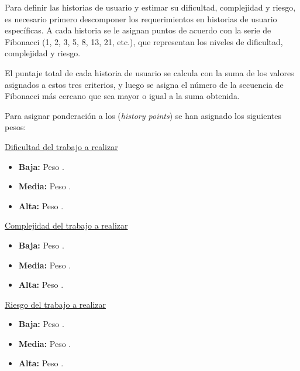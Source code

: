 Para definir las historias de usuario y estimar su dificultad, complejidad y
riesgo, es necesario primero descomponer los requerimientos en historias de
usuario específicas. A cada historia se le asignan puntos de acuerdo con la
serie de Fibonacci (1, 2, 3, 5, 8, 13, 21, etc.), que representan los niveles
de dificultad, complejidad y riesgo.

El puntaje total de cada historia de usuario se calcula con la suma de los
valores asignados a estos tres criterios, y luego se asigna el número de la
secuencia de Fibonacci más cercano que sea mayor o igual a la suma obtenida.

Para asignar ponderación a los (\textit{history points}) se han asignado los
siguientes pesos:

\pagebreak

\underline{Dificultad del trabajo a realizar}
\begin{itemize}
	\item \textbf{Baja:} Peso .
	\item \textbf{Media:} Peso .
	\item \textbf{Alta:} Peso .
\end{itemize}

\underline{Complejidad del trabajo a realizar}
\begin{itemize}
	\item \textbf{Baja:} Peso .
	\item \textbf{Media:} Peso .
	\item \textbf{Alta:} Peso .
\end{itemize}

\underline{Riesgo del trabajo a realizar}
\begin{itemize}
	\item \textbf{Baja:} Peso .
	\item \textbf{Media:} Peso .
	\item \textbf{Alta:} Peso .
\end{itemize}

